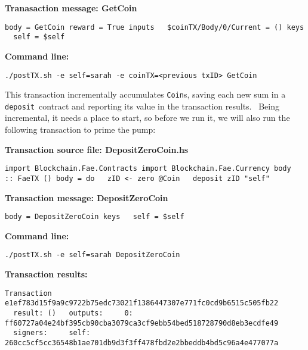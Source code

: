 \documentclass[11pt]{article}
\newcommand{\codeblock}[1]{\begin{mdframed}[
    backgroundcolor=header-color,
    linecolor=header-color,
    innertopmargin=10pt,
    ]{\texttt{#1}}\end{mdframed}}
\begin{document}
\textbf{Tranasaction message: GetCoin}

\codeblock{body = GetCoin\newline
reward = True\newline
inputs\newline
  \$coinTX\slash{}Body\slash{}0\slash{}Current = ()\newline
keys\newline
  self = \$self}

\textbf{Command line:}

\codeblock{.\slash{}postTX.sh -e self=sarah -e coinTX=\textless{}previous txID\textgreater{} GetCoin}

This transaction incrementally accumulates \texttt{Coin}s, saving each new sum in a \texttt{deposit} contract and reporting its value in the transaction results.  Being incremental, it needs a place to start, so before we run it, we will also run the following transaction to prime the pump:


\vspace{11pt}

\textbf{Transaction source file: DepositZeroCoin.hs}

\codeblock{import Blockchain.Fae.Contracts\newline
import Blockchain.Fae.Currency\newline
\newline
body :: FaeTX ()\newline
body = do\newline
  zID \textless{}- zero @Coin\newline
  deposit zID "self"}

\textbf{Transaction message: DepositZeroCoin}

\codeblock{body = DepositZeroCoin\newline
keys\newline
  self = \$self}

\textbf{Command line:}

\codeblock{.\slash{}postTX.sh -e self=sarah DepositZeroCoin}

\textbf{Transaction results:}

\codeblock{Transaction e1ef783d15f9a9c9722b75edc73021f1386447307e771fc0cd9b6515c505fb22\newline
  result: ()\newline
  outputs:\newline
    0: ff60727a04e24bf395cb90cba3079ca3cf9ebb54bed518728790d8eb3ecdfe49\newline
  signers:\newline
    self: 260cc5cf5cc36548b1ae701db9d3f3ff478fbd2e2bbeddb4bd5c96a4e477077a}
\end{document}
